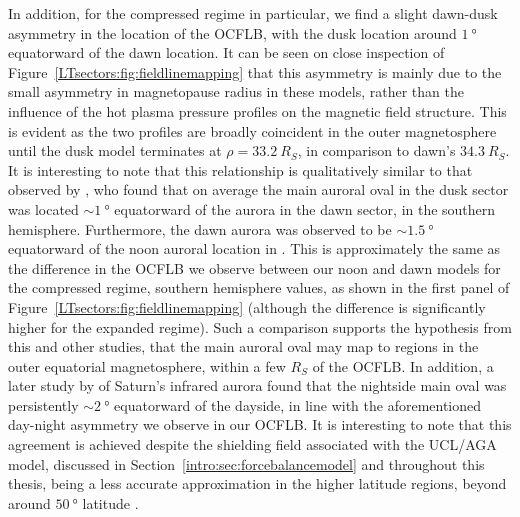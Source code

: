 In addition, for the compressed regime in particular, we find a slight dawn-dusk asymmetry in the location of the OCFLB, with the dusk location around $\SI{1}{\degree}$ equatorward of the dawn location. It can be seen on close inspection of Figure~\ref{LTsectors:fig:fieldlinemapping} that this asymmetry is mainly due to the small asymmetry in magnetopause radius in these models, rather than the influence of the hot plasma pressure profiles on the magnetic field structure. This is evident as the two profiles are broadly coincident in the outer magnetosphere until the dusk model terminates at $\rho=\SI{33.2}{R_S}$, in comparison to dawn's $\SI{34.3}{R_S}$. It is interesting to note that this relationship is qualitatively similar to that observed by \citet{badman2006}, who found that on average the main auroral oval in the dusk sector was located ${\sim}\SI{1}{\degree}$ equatorward of the aurora in the dawn sector, in the southern hemisphere. Furthermore, the dawn aurora was observed to be ${\sim}\SI{1.5}{\degree}$ equatorward of the noon auroral location in \citet{badman2006}. This is approximately the same as the difference in the OCFLB we observe between our noon and dawn models for the compressed regime, southern hemisphere values, as shown in the first panel of Figure~\ref{LTsectors:fig:fieldlinemapping} (although the difference is significantly higher for the expanded regime). Such a comparison supports the hypothesis from this and other studies, that the main auroral oval may map to regions in the outer equatorial magnetosphere, within a few $\si{R_S}$ of the OCFLB. In addition, a later study by \citet{badman2011} of Saturn's infrared aurora found that the nightside main oval was persistently ${\sim}\SI{2}{\degree}$ equatorward of the dayside, in line with the aforementioned day-night asymmetry we observe in our OCFLB. It is interesting to note that this agreement is achieved despite the shielding field associated with the UCL/AGA model, discussed in Section~\ref{intro:sec:forcebalancemodel} and throughout this thesis, being a less accurate approximation in the higher latitude regions, beyond around $\SI{50}{\degree}$ latitude \citep{caudal1986}.

